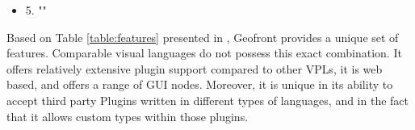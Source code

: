 \begin{itemize}[ ]
  \item 5. "\myNewSubRQFive"
\end{itemize}


Based on Table \ref{table:features} presented in , Geofront provides a unique set of features. 
Comparable visual languages do not possess this exact combination. 
It offers relatively extensive plugin support compared to other VPLs, it is web based, and offers a range of \ac{GUI} nodes. 
Moreover, it is unique in its ability to accept third party Plugins written in different types of languages, and in the fact that it allows custom types within those plugins. 








